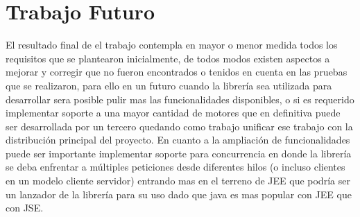 \chapter*{Trabajo Futuro}
El resultado final de el trabajo contempla en mayor o menor medida todos los requisitos que se plantearon inicialmente, de todos modos existen aspectos a mejorar y corregir que no fueron encontrados o tenidos en cuenta en las pruebas que se realizaron, para ello en un futuro cuando la librería sea utilizada para desarrollar sera posible pulir mas las funcionalidades disponibles, o si es requerido implementar soporte a una mayor cantidad de motores que en definitiva puede ser desarrollada por un tercero quedando como trabajo unificar ese trabajo con la distribución principal del proyecto.
En cuanto a la ampliación de funcionalidades puede ser importante implementar soporte para concurrencia en donde la librería se deba enfrentar a múltiples peticiones desde diferentes hilos (o incluso clientes en un modelo cliente servidor) entrando mas en el terreno de JEE que podría ser un lanzador de la librería para su uso dado que java es mas popular con JEE que con JSE.
 